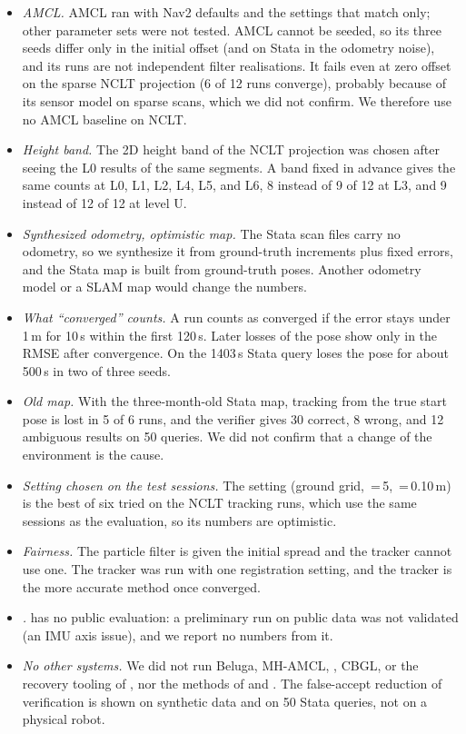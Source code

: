 \begin{itemize}
  \item \emph{AMCL.} AMCL ran with Nav2 defaults and the settings that match  only; other parameter sets were not tested. AMCL cannot be seeded, so its three seeds differ only in the initial offset (and on Stata in the odometry noise), and its runs are not independent filter realisations. It fails even at zero offset on the sparse NCLT projection (6 of 12 runs converge), probably because of its sensor model on sparse scans, which we did not confirm. We therefore use no AMCL baseline on NCLT.
  \item \emph{Height band.} The 2D height band of the NCLT projection was chosen after seeing the L0 results of the same segments. A band fixed in advance gives the same counts at L0, L1, L2, L4, L5, and L6, 8 instead of 9 of 12 at L3, and 9 instead of 12 of 12 at level U.
  \item \emph{Synthesized odometry, optimistic map.} The Stata scan files carry no odometry, so we synthesize it from ground-truth increments plus fixed errors, and the Stata map is built from ground-truth poses. Another odometry model or a SLAM map would change the numbers.
  \item \emph{What ``converged'' counts.} A run counts as converged if the error stays under 1\,m for 10\,s within the first 120\,s. Later losses of the pose show only in the RMSE after convergence. On the 1403\,s Stata query  loses the pose for about 500\,s in two of three seeds.
  \item \emph{Old map.} With the three-month-old Stata map, tracking from the true start pose is lost in 5 of 6 runs, and the verifier gives 30 correct, 8 wrong, and 12 ambiguous results on 50 queries. We did not confirm that a change of the environment is the cause.
  \item \emph{Setting chosen on the test sessions.} The  setting (ground grid, \,=\,5, \,=\,0.10\,m) is the best of six tried on the NCLT tracking runs, which use the same sessions as the evaluation, so its numbers are optimistic.
  \item \emph{Fairness.} The particle filter is given the initial spread and the tracker cannot use one. The tracker was run with one registration setting, and the tracker is the more accurate method once converged.
  \item \emph{.}  has no public evaluation: a preliminary run on public data was not validated (an IMU axis issue), and we report no numbers from it.
  \item \emph{No other systems.} We did not run Beluga, MH-AMCL, , CBGL, or the recovery tooling of  \citep{sasaki2026globalloc}, nor the methods of \citet{zhang2026krp} and \citet{gao2019global}. The false-accept reduction of verification is shown on synthetic data and on 50 Stata queries, not on a physical robot.
\end{itemize}
